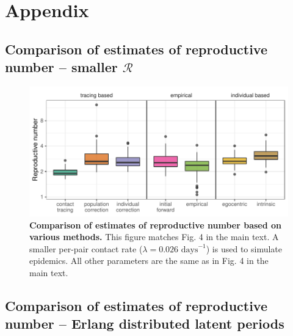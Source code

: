 \documentclass[12pt]{article}
\date{\today}
\newcommand{\RR}{\ensuremath{{\mathcal R}}}
\begin{document}
\appendix
\renewcommand\thefigure{\thesection.\arabic{figure}}
\setcounter{figure}{0}    
\section{Appendix}

\subsection{Comparison of estimates of reproductive number -- smaller $\RR$}

\begin{figure}[!h]
\includegraphics[width=\textwidth]{../fig/cmp_reproductive_small.pdf}
\caption{\textbf{Comparison of estimates of reproductive number based on various methods.}
This figure matches Fig. 4 in the main text.
A smaller per-pair contact rate ($\lambda = 0.026 \textrm{ days}^{-1}$) is used to simulate epidemics.
All other parameters are the same as in Fig. 4 in the main text.
}
\label{fig:cmpsmall}
\end{figure}

\pagebreak

\subsection{Comparison of estimates of reproductive number -- Erlang distributed latent periods}
\end{document}
